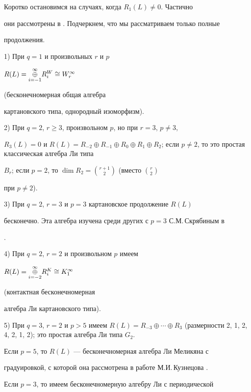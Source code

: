 Коротко остановимся на случаях, когда $R_1(L) \ne 0$. Частично


они рассмотрены в \cite{Kan}. Подчеркнем, что мы рассматриваем только полные


продолжения.





1) При $q=1$ и произвольных $r$ и $p$


$R(L)=\underset{i=-1}{\overset{\infty}{\oplus}}{}R_i^W \cong W_r^{\infty }$


(бесконечномерная общая алгебра


картановского типа, однородный изоморфизм).





2) При $q=2$, $r\ge 3$, произвольном $p$, но при $r=3$, $p\ne 3$, 


$R_3(L)=0$ и $R(L)=R_{-2}\oplus R_{-1}\oplus R_0 \oplus R_1 \oplus


R_2$; если $p\ne 2$, то это простая классическая алгебра Ли типа


$B_r$; если $p=2$, то $\dim R_2=\binom{r+1}{2}$ (вместо $\binom{r}{2}$


при $p\ne 2$).





3) При $q=2$, $r=3$ и $p=3$ картановское продолжение $R(L)$


бесконечно. Эта алгебра изучена среди других с $p=3$ С.М.\,Скрябиным в


\cite{Skr}.





4) При $q=2$, $r=2$ и произвольном $p$ имеем


$R(L)=\underset{i=-2}{\overset{\infty }{\oplus}}{}R_i^K \cong K_1^{\infty }$


(контактная бесконечномерная


алгебра Ли картановского типа).





5) При $q=3$, $r=2$ и $p>5$ имеем $R(L)=R_{-3}\oplus \dotsb \oplus


R_3$ (размерности 2, 1, 2, 4, 2, 1, 2); это простая алгебра Ли типа $G_2$.


Если $p=5$, то $R(L)$ --- бесконечномерная алгебра Ли Меликяна с


градуировкой, с которой она рассмотрена в работе М.И.\,Кузнецова \cite{Kuz}.


Если $p=3$, то имеем бесконечномерную алгебру Ли с периодической


